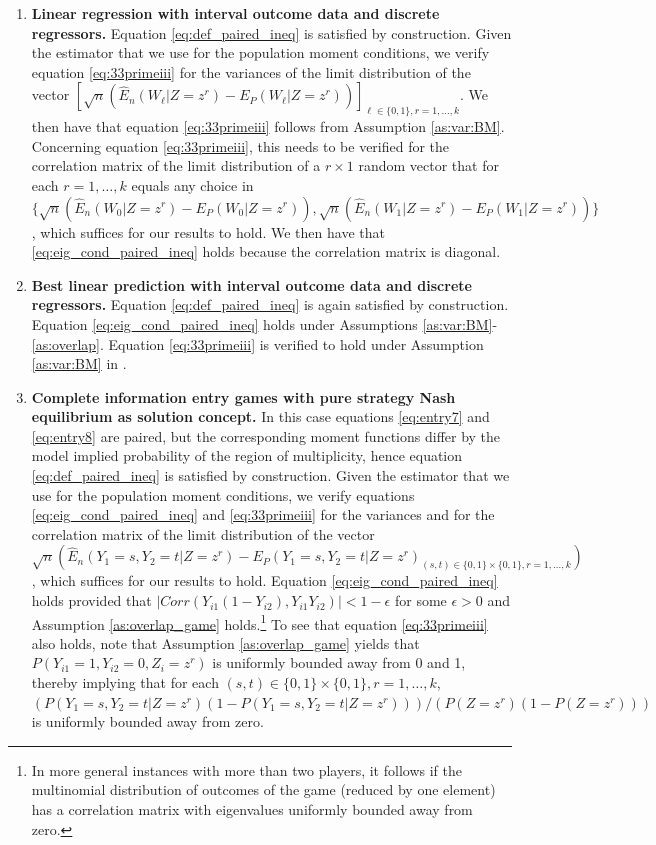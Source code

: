 \documentclass[letterpaper,11pt]{article}
\theoremstyle{myplain}
\theoremstyle{mydefinition}
\theoremstyle{myremark}
\renewcommand{\cite}{\citet}
\numberwithin{equation}{section}
\numberwithin{figure}{section}
\begin{document}
\begin{appendices}
\begin{enumerate}
\item \textbf{Linear regression with interval outcome data and discrete regressors.} Equation \eqref{eq:def_paired_ineq} is satisfied by construction. Given the estimator that we use for the population moment conditions, we verify equation \eqref{eq:33primeiii} for the variances of the limit distribution of the vector $[\sqrt{n}(\hat{E}_n(W_\ell|Z=z^r)-E_P(W_\ell|Z=z^r))]_{\ell\in \{0,1\},r=1,\dots,k}$. We then have that equation \eqref{eq:33primeiii} follows from Assumption \ref{as:var:BM}.
Concerning equation \eqref{eq:33primeiii}, this needs to be verified for the correlation matrix of the limit distribution of a $r\times 1$ random vector that for each $r=1,\dots,k$ equals any choice in $\{\sqrt{n}(\hat{E}_n(W_0|Z=z^r)-E_P(W_0|Z=z^r)),\sqrt{n}(\hat{E}_n(W_1|Z=z^r)-E_P(W_1|Z=z^r))\}$, which suffices for our results to hold. We then have that \eqref{eq:eig_cond_paired_ineq} holds because the correlation matrix is diagonal.
\item \textbf{Best linear prediction with interval outcome data and discrete regressors.} Equation \eqref{eq:def_paired_ineq} is again satisfied by construction. Equation \eqref{eq:eig_cond_paired_ineq} holds under Assumptions \ref{as:var:BM}-\ref{as:overlap}.
Equation \eqref{eq:33primeiii} is verified to hold under Assumption \ref{as:var:BM} in \cite[p. 808]{ber:mol08}. 
\item \textbf{Complete information entry games with pure strategy Nash equilibrium as solution concept.} 
In this case equations \eqref{eq:entry7} and \eqref{eq:entry8} are paired, but the corresponding moment functions differ by the model implied probability of the region of multiplicity, hence equation \eqref{eq:def_paired_ineq} is satisfied by construction. 
Given the estimator that we use for the population moment conditions, we verify equations \eqref{eq:eig_cond_paired_ineq} and \eqref{eq:33primeiii} for the variances and for the correlation matrix of the limit distribution of the vector $\sqrt{n}(\hat{E}_n(Y_1=s,Y_2=t|Z=z^r)-E_P(Y_1=s,Y_2=t|Z=z^r)_{(s,t)\in \{0,1\}\times\{0,1\},r=1,\dots,k})$, which suffices for our results to hold. 
Equation \eqref{eq:eig_cond_paired_ineq} holds provided that $|Corr(Y_{i1}(1- Y_{i2}),Y_{i1} Y_{i2})|<1-\epsilon$ for some $\epsilon>0$ and Assumption \ref{as:overlap_game} holds.\footnote{In more general instances with more than two players, it follows if the multinomial distribution of outcomes of the game (reduced by one element) has a correlation matrix with eigenvalues uniformly bounded away from zero.}
To see that equation \eqref{eq:33primeiii} also holds, note that Assumption \ref{as:overlap_game} yields that $P(Y_{i1}=1,Y_{i2}=0, Z_i=z^r)$ is uniformly bounded away from 0 and 1, thereby implying that for each 
$(s,t)\in \{0,1\}\times\{0,1\},r=1,\dots,k$, $(P(Y_1=s,Y_2=t|Z=z^r)(1-P(Y_1=s,Y_2=t|Z=z^r)))/(P(Z=z^r)(1-P(Z=z^r)))$ is uniformly bounded away from zero. 


\end{enumerate}
\end{appendices}
\end{document}
